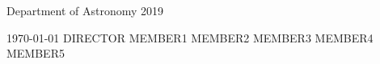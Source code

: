 \documentclass[dissertation,CC-BY-ND]{uathesis}
\begin{document}
\maketitlepage
{{Department of Astronomy}}	%
{2019}							

\approval
{\today}		%
{DIRECTOR}		%
{MEMBER1}		%
{MEMBER2}		%
{MEMBER3}		    %
{MEMBER4} %
{MEMBER5} %

\statementbyauthor



\tableofcontents

\listoffigures

\listoftables



\appendix

\renewcommand{\baselinestretch}{1}		%
\small\normalsize										%



\end{document}
